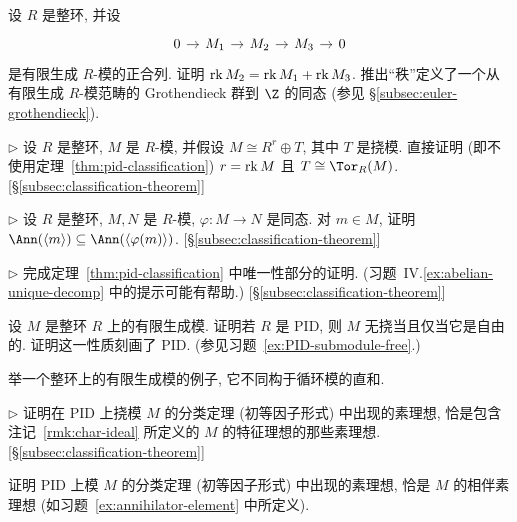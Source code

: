 \begin{prob}\label{ex:rank-ses}
设 $R$ 是整环, 并设
$$
\begin{tikzcd}[column sep=.9em]
0 \ar[r] & M_1 \ar[r] & M_2 \ar[r] & M_3 \ar[r] & 0
\end{tikzcd}
$$
是有限生成 $R$-模的正合列. 证明 $\operatorname{rk} M_2=\operatorname{rk} M_1+\operatorname{rk} M_3$. 推出``秩''定义了一个从有限生成 $R$-模范畴的 Grothendieck 群到 $\Z$ 的同态 (参见 §\ref{subsec:euler-grothendieck}).
\end{prob}

\begin{prob}\label{ex:rk-torsion-direct}
$\triangleright$ 设 $R$ 是整环, $M$ 是 $R$-模, 并假设 $M\cong R^r\oplus T$, 其中 $T$ 是挠模. 直接证明 (即不使用定理~\ref{thm:pid-classification}) $r=\operatorname{rk} M$ 且 $T\cong\Tor_R(M)$. [§\ref{subsec:classification-theorem}]
\end{prob}

\begin{prob}\label{ex:ann-submodule-hom}
$\triangleright$ 设 $R$ 是整环, $M,N$ 是 $R$-模, $\varphi:M\to N$ 是同态. 对 $m\in M$, 证明 $\Ann(\langle m\rangle)\subseteq\Ann(\langle\varphi(m)\rangle)$. [§\ref{subsec:classification-theorem}]
\end{prob}

\begin{prob}\label{ex:complete-uniqueness-5-6}
$\triangleright$ 完成定理~\ref{thm:pid-classification} 中唯一性部分的证明. (习题~IV.\ref{ex:abelian-unique-decomp} 中的提示可能有帮助.) [§\ref{subsec:classification-theorem}]
\end{prob}

\begin{prob}\label{ex:pid-tf-free}
设 $M$ 是整环 $R$ 上的有限生成模. 证明若 $R$ 是 PID, 则 $M$ 无挠当且仅当它是自由的. 证明这一性质刻画了 PID. (参见习题~\ref{ex:PID-submodule-free}.)
\end{prob}

\begin{prob}\label{ex:non-cyclic-ds}
举一个整环上的有限生成模的例子, 它不同构于循环模的直和.
\end{prob}

\begin{prob}\label{ex:prime-char-ideal-pid}
$\triangleright$ 证明在 PID 上挠模 $M$ 的分类定理 (初等因子形式) 中出现的素理想, 恰是包含注记~\ref{rmk:char-ideal} 所定义的 $M$ 的特征理想的那些素理想. [§\ref{subsec:classification-theorem}]
\end{prob}

\begin{prob}\label{ex:associated-primes-pid}
证明 PID 上模 $M$ 的分类定理 (初等因子形式) 中出现的素理想, 恰是 $M$ 的相伴素理想 (如习题~\ref{ex:annihilator-element} 中所定义).
\end{prob}

